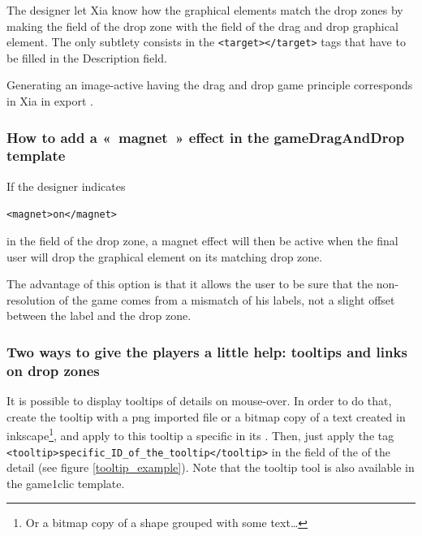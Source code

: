 The designer let Xia know how the graphical elements match the drop zones by 
making the  field of the drop zone 
with the  field of the drag and drop graphical element. 
The only subtlety consists in the  \verb|<target></target>| tags that have to be filled in the \chemin
{Description} field.

Generating an image-active having the drag and
drop game principle corresponds in Xia in export .



\subsubsection{How to add a «~magnet~» effect in the gameDragAndDrop template}

If the designer indicates\\
\begin{center}
\verb|<magnet>on</magnet>| 
\end{center}
in the  field of the drop zone, a 
magnet effect will then be active when the final user will drop the 
graphical element on its matching drop zone.

The advantage of this option is that it allows the user to be sure 
that the non-resolution of the game comes from a mismatch of his 
labels, not a slight offset between the label and the drop zone.

\subsubsection{Two ways to give the players a little help: tooltips and links on drop zones}

It is possible to display tooltips of details on mouse-over. In order to do that, 
create the tooltip with a png imported file or a bitmap copy of a text created in 
inkscape\footnote{Or a bitmap copy of a shape grouped with some text\ldots}, and 
apply to this tooltip a specific  in its . Then, 
just apply the tag \verb|<tooltip>specific_ID_of_the_tooltip</tooltip>| in the 
 field of the  of the detail (see figure \ref{tooltip_example}).
Note that the tooltip tool is also available in the game1clic template.

